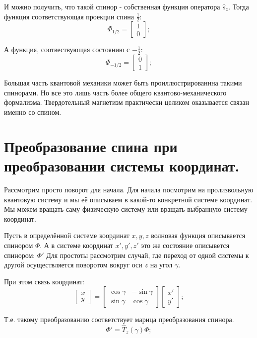 \documentclass[a4paper, 14pt, russian]{article}
\newcommand{\be}{\begin{equation}}
\newcommand{\ee}{\end{equation}}
\begin{document}
	И можно получить, что такой спинор - собственная функция оператора $\hat{s}_z$.
	Тогда функция соответствующая проекции спина $\frac{1}{2}$:
	\be
		\Phi_{1/2} = \begin{bmatrix} 1 \\ 0 \end{bmatrix};
	\ee

	А функция, соотвествующая состоянию с $-\frac{1}{2}$:
	\be
		\Phi_{-1/2} = \begin{bmatrix} 0 \\ 1 \end{bmatrix};
	\ee

	Большая часть квантовой механики может быть проиллюстрированнна такими спинорами.
	Но все это лишь часть более общего квантово-механического формализма. 
	Твердотельный магнетизм практически целиком оказывается связан именно со спином.

	\section{Преобразование спина при преобразовании системы координат.}

	Рассмотрим просто поворот для начала. Для начала посмотрим на пролизвольную 
	квантовую систему и мы её описываем в какой-то конкретной системе координат.
	Мы можем вращать саму физическую систему или вращать выбранную систему координат.

	Пусть в определённой системе координат $x,y,z$ волновая функция описывается 
	спинором $\Phi$. А в системе координат $x',y',z'$ это же состояние описывется спинором:
	$\Phi'$ Для простоты рассмотрим случай, где переход от одной системы к другой осуществляется
	поворотом вокруг оси $z$ на угол $\gamma$.

	При этом связь координат:
	\be
		\begin{bmatrix} x\\ y \end{bmatrix} = 
			\begin{bmatrix}
				\cos \gamma & - \sin \gamma\\
				\sin \gamma & \cos \gamma
			\end{bmatrix} 
		\begin{bmatrix} x' \\ y' \end{bmatrix};
	\ee

	Т.е. такому преобразованию соответствует марица преобразования спинора.
	\be
		\Phi ' = \hat{T}_{z} (\gamma) \Phi;
	\ee
\end{document}
